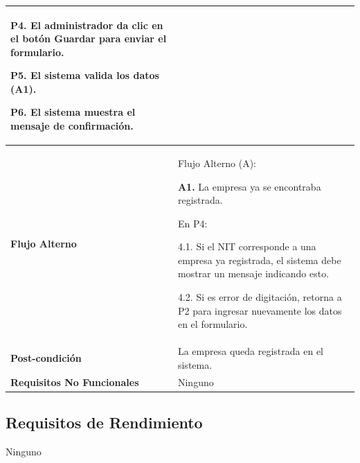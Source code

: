 \documentclass[12pt,a4paper]{article}
\begin{document}
\begin{center}
\begin{tabular}{|p{5.5cm}| p{9.5cm}|}
\textbf{P4.} El administrador da clic en el botón Guardar para enviar el formulario.

\textbf{P5.} El sistema valida los datos (A1).

\textbf{P6.} El sistema muestra el mensaje de confirmación.
\\
\hline 
\textbf{Flujo Alterno} &  Flujo Alterno (A):

\textbf{A1.} La empresa ya se encontraba registrada.

	En P4:
	
	4.1. Si el NIT corresponde a una empresa ya registrada, el sistema debe mostrar un mensaje indicando esto.
	
	4.2. Si es error de digitación, retorna a P2 para ingresar nuevamente los datos en el formulario. \\ 
\hline 
\textbf{Post-condición}  & La empresa queda registrada en el sistema. \\ 
\hline 
\textbf{Requisitos No Funcionales} & Ninguno \\ 
\hline 
\end{tabular}
\end{center}
\subsection{Requisitos de Rendimiento}
Ninguno
\end{document}
